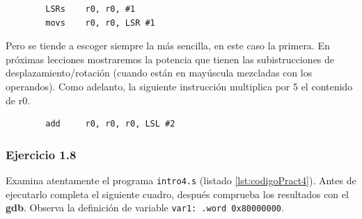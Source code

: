 \begin{lstlisting}
        LSRs    r0, r0, #1
        movs    r0, r0, LSR #1
\end{lstlisting}

Pero se tiende a escoger siempre la más sencilla, en este caso la primera. En
próximas lecciones mostraremos la potencia que tienen las subistrucciones de
desplazamiento/rotación (cuando están en mayúscula mezcladas con los operandos).
Como adelanto, la siguiente instrucción multiplica por 5 el contenido de r0.

\begin{lstlisting}
        add     r0, r0, r0, LSL #2
\end{lstlisting}

\subsubsection{Ejercicio 1.8}
Examina atentamente el programa {\tt intro4.s} (listado \ref{lst:codigoPract4}).
Antes de ejecutarlo completa el siguiente cuadro, después comprueba los resultados con
el {\bf gdb}. Observa la definición de variable {\tt var1: .word 0x80000000}.

